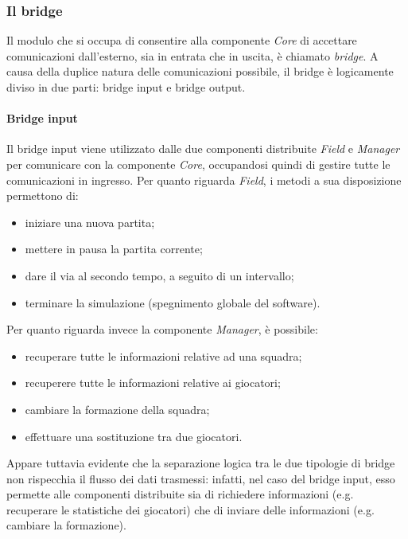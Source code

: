 \subsubsection{Il bridge}
\label{sec:analisi_distribuzione_bridge}

Il modulo che si occupa di consentire alla componente \textit{Core} di accettare comunicazioni dall'esterno, sia in entrata che in uscita, è chiamato \textit{bridge}. A causa della duplice natura delle comunicazioni possibile, il bridge è logicamente diviso in due parti: bridge input e bridge output.

\paragraph{Bridge input}\label{sec:analisi_distribuzione_bridge_input} Il bridge input viene utilizzato dalle due componenti distribuite \textit{Field} e \textit{Manager} per comunicare con la componente \textit{Core}, occupandosi quindi di gestire tutte le comunicazioni in ingresso. Per quanto riguarda \textit{Field}, i metodi a sua disposizione permettono di:

\begin{itemize}
	\item iniziare una nuova partita;
	\item mettere in pausa la partita corrente;
	\item dare il via al secondo tempo, a seguito di un intervallo;
	\item terminare la simulazione (spegnimento globale del software).
\end{itemize}

\noindent Per quanto riguarda invece la componente \textit{Manager}, è possibile:

\begin{itemize}
	\item recuperare tutte le informazioni relative ad una squadra;
	\item recuperere tutte le informazioni relative ai giocatori;
	\item cambiare la formazione della squadra;
	\item effettuare una sostituzione tra due giocatori.
\end{itemize}

Appare tuttavia evidente che la separazione logica tra le due tipologie di bridge non rispecchia il flusso dei dati trasmessi: infatti, nel caso del bridge input, esso permette alle componenti distribuite sia di richiedere informazioni (e.g. recuperare le statistiche dei giocatori) che di inviare delle informazioni (e.g. cambiare la formazione).\\


